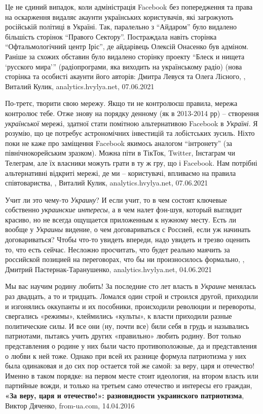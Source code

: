 Це не єдиний випадок, коли адміністрація Facebook без попередження та права на
оскарження видаляє акаунти українських користувачів, які загрожують російській
політиці в Україні.  Так, паралельно з \enquote{Айдаром} було видалено
більшість сторінок \enquote{Правого Сектору}. Постраждала навіть сторінка
\enquote{Офтальмологічний центр Іріс}, де айдарівець Олексій Онасенко був
адміном.  Раніше за схожих обставин було видалено сторінку проекту
\enquote{Блеск и нищета \enquote{русского мира}} (радіопрограми, яка виходить
на українському радіо) (нова сторінка та особисті акаунти його авторів: Дмитра
Левуся та Олега Лісного,
, Виталий Кулик, analytics.hvylya.net, 07.06.2021

По-третє, творити свою мережу. Якщо ти не контролюєш правила, мережа контролює
тебе. Отже знову на порядку денному (як в 2013-2014 рр) – створення \emph{української}
мережі, здатної стати помітною альтернативою Facebook в \emph{Україні}. Я розумію, що
це потребує астрономічних інвестицій та лобістських зусиль. Ніхто поки не каже
про заміщення Facebook якимось аналогом \enquote{інтронету} (за
північнокорейським зразком). Можна піти в ТікТок, Twitter, Інстаграм чи
Телеграм, але їх власники можуть грати в ту ж гру, що і Facebook. Нам потрібні
альтернативні відкриті мережі, де ми – користувачі, впливаємо на правила
співтовариства,
, Виталий Кулик, analytics.hvylya.net, 07.06.2021

Учит ли это чему-то \emph{Украину}? И если учит, то в чем состоят ключевые
собственно \emph{украинские интересы}, а в чем налет фэн-шуя, который выглядит
красиво, но не всегда ощущается приложенным к нужному месту.  Есть ли вообще у
\emph{Украины} видение, о чем договариваться с Россией, если уж начинать
договариваться?  Чтобы что-то увидеть впереди, надо увидеть и трезво оценить
то, что есть сейчас.  Несложно просчитать, что будет реально маячить за
российской позицией на переговорах, что бы ни произносилось формально,
, Дмитрий Пастернак-Таранушенко, analytics.hvylya.net, 04.06.2021

Мы вас научим родину любить!  За последние сто лет власть в \emph{Украине} менялась
раз двадцать, а то и тридцать. Ломался один строй и строился другой, приходили
и изгонялись оккупанты и их пособники, происходили революции и перевороты,
свергались «режимы», клеймились «культы», к власти приходили разные
политические силы. И все они (ну, почти все) били себя в грудь и назывались
патриотами, пытаясь учить других «правильно» любить родину. Вот только
представления о родине у них были часто противоположные, да и представления о
любви к ней тоже.  Однако при всей их разнице формула патриотизма у них была
одинаковая и до сих пор остается той же самой: за веру, царя и отечество!
Именно в таком порядке: на первом месте стоит идеология, на втором власть или
партийные вожди, и только на третьем само отечество и интересы его граждан,
\textbf{«За веру, царя и отечество!»: разновидности украинского патриотизма},
Виктор Дяченко, from-ua.com, 14.04.2016

